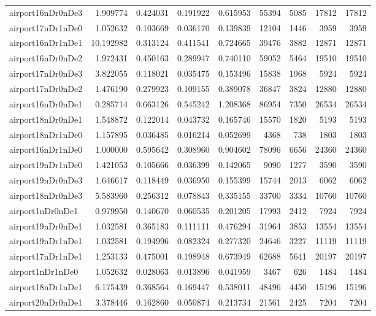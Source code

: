 \documentclass[../../../thesis.tex]{subfiles}
\begin{document}
\begin{longtable}{|l|r|r|r|r|r|r|r|r|}
airport16nDr0nDe3 & 1.909774 & 0.424031 & 0.191922 & 0.615953 & 55394 & 5085 & 17812 & 17812 \\
airport17nDr1nDe0 & 1.052632 & 0.103669 & 0.036170 & 0.139839 & 12104 & 1446 & 3959 & 3959 \\
airport16nDr1nDe1 & 10.192982 & 0.313124 & 0.411541 & 0.724665 & 39476 & 3882 & 12871 & 12871 \\
airport16nDr0nDe2 & 1.972431 & 0.450163 & 0.289947 & 0.740110 & 59052 & 5464 & 19510 & 19510 \\
airport17nDr0nDe3 & 3.822055 & 0.118021 & 0.035475 & 0.153496 & 15838 & 1968 & 5924 & 5924 \\
airport17nDr0nDe2 & 1.476190 & 0.279923 & 0.109155 & 0.389078 & 36847 & 3824 & 12880 & 12880 \\
airport16nDr0nDe1 & 0.285714 & 0.663126 & 0.545242 & 1.208368 & 86954 & 7350 & 26534 & 26534 \\
airport18nDr0nDe1 & 1.548872 & 0.122014 & 0.043732 & 0.165746 & 15570 & 1820 & 5193 & 5193 \\
airport18nDr1nDe0 & 1.157895 & 0.036485 & 0.016214 & 0.052699 & 4368 & 738 & 1803 & 1803 \\
airport16nDr1nDe0 & 1.000000 & 0.595642 & 0.308960 & 0.904602 & 78096 & 6656 & 24360 & 24360 \\
airport19nDr1nDe0 & 1.421053 & 0.105666 & 0.036399 & 0.142065 & 9090 & 1277 & 3590 & 3590 \\
airport19nDr0nDe3 & 1.646617 & 0.118449 & 0.036950 & 0.155399 & 15744 & 2013 & 6062 & 6062 \\
airport18nDr0nDe3 & 5.583960 & 0.256312 & 0.078843 & 0.335155 & 33700 & 3334 & 10760 & 10760 \\
airport1nDr0nDe1 & 0.979950 & 0.140670 & 0.060535 & 0.201205 & 17993 & 2412 & 7924 & 7924 \\
airport19nDr0nDe1 & 1.032581 & 0.365183 & 0.111111 & 0.476294 & 31964 & 3853 & 13554 & 13554 \\
airport19nDr1nDe1 & 1.032581 & 0.194996 & 0.082324 & 0.277320 & 24646 & 3227 & 11119 & 11119 \\
airport17nDr1nDe1 & 1.253133 & 0.475001 & 0.198948 & 0.673949 & 62688 & 5641 & 20197 & 20197 \\
airport1nDr1nDe0 & 1.052632 & 0.028063 & 0.013896 & 0.041959 & 3467 & 626 & 1484 & 1484 \\
airport18nDr1nDe1 & 6.175439 & 0.368564 & 0.169447 & 0.538011 & 48496 & 4450 & 15196 & 15196 \\
airport20nDr0nDe1 & 3.378446 & 0.162860 & 0.050874 & 0.213734 & 21561 & 2425 & 7204 & 7204 \\

\end{longtable}
\end{document}
